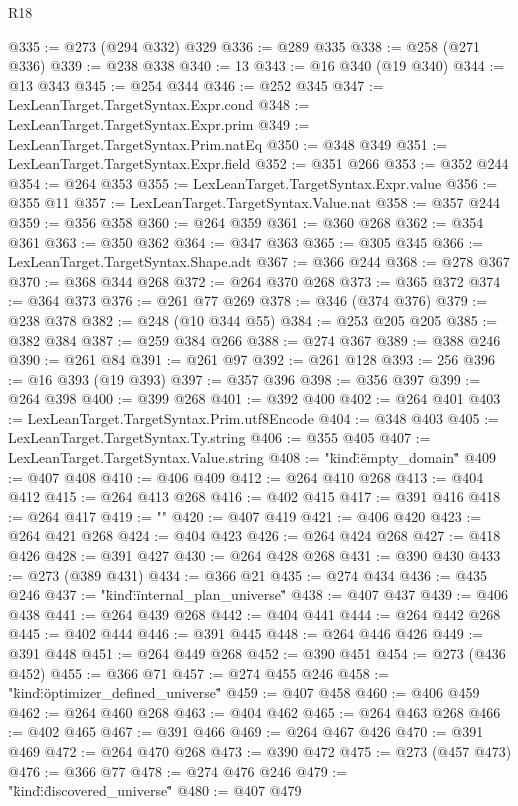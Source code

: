 \begin{lexlean}{R18}
\begin{coremodule}
@335 := @273 (@294 @332) @329
@336 := @289 @335
@338 := @258 (@271 @336)
@339 := @238 @338
@340 := 13
@343 := @16 @340 (@19 @340)
@344 := @13 @343
@345 := @254 @344
@346 := @252 @345
@347 := LexLeanTarget.TargetSyntax.Expr.cond
@348 := LexLeanTarget.TargetSyntax.Expr.prim
@349 := LexLeanTarget.TargetSyntax.Prim.natEq
@350 := @348 @349
@351 := LexLeanTarget.TargetSyntax.Expr.field
@352 := @351 @266
@353 := @352 @244
@354 := @264 @353
@355 := LexLeanTarget.TargetSyntax.Expr.value
@356 := @355 @11
@357 := LexLeanTarget.TargetSyntax.Value.nat
@358 := @357 @244
@359 := @356 @358
@360 := @264 @359
@361 := @360 @268
@362 := @354 @361
@363 := @350 @362
@364 := @347 @363
@365 := @305 @345
@366 := LexLeanTarget.TargetSyntax.Shape.adt
@367 := @366 @244
@368 := @278 @367
@370 := @368 @344 @268
@372 := @264 @370 @268
@373 := @365 @372
@374 := @364 @373
@376 := @261 @77 @269
@378 := @346 (@374 @376)
@379 := @238 @378
@382 := @248 (@10 @344 @55)
@384 := @253 @205 @205
@385 := @382 @384
@387 := @259 @384 @266
@388 := @274 @367
@389 := @388 @246
@390 := @261 @84
@391 := @261 @97
@392 := @261 @128
@393 := 256
@396 := @16 @393 (@19 @393)
@397 := @357 @396
@398 := @356 @397
@399 := @264 @398
@400 := @399 @268
@401 := @392 @400
@402 := @264 @401
@403 := LexLeanTarget.TargetSyntax.Prim.utf8Encode
@404 := @348 @403
@405 := LexLeanTarget.TargetSyntax.Ty.string
@406 := @355 @405
@407 := LexLeanTarget.TargetSyntax.Value.string
@408 := "{\"kind\":\"empty_domain\""
@409 := @407 @408
@410 := @406 @409
@412 := @264 @410 @268
@413 := @404 @412
@415 := @264 @413 @268
@416 := @402 @415
@417 := @391 @416
@418 := @264 @417
@419 := "}"
@420 := @407 @419
@421 := @406 @420
@423 := @264 @421 @268
@424 := @404 @423
@426 := @264 @424 @268
@427 := @418 @426
@428 := @391 @427
@430 := @264 @428 @268
@431 := @390 @430
@433 := @273 (@389 @431)
@434 := @366 @21
@435 := @274 @434
@436 := @435 @246
@437 := "{\"kind\":\"internal_plan_universe\""
@438 := @407 @437
@439 := @406 @438
@441 := @264 @439 @268
@442 := @404 @441
@444 := @264 @442 @268
@445 := @402 @444
@446 := @391 @445
@448 := @264 @446 @426
@449 := @391 @448
@451 := @264 @449 @268
@452 := @390 @451
@454 := @273 (@436 @452)
@455 := @366 @71
@457 := @274 @455 @246
@458 := "{\"kind\":\"optimizer_defined_universe\""
@459 := @407 @458
@460 := @406 @459
@462 := @264 @460 @268
@463 := @404 @462
@465 := @264 @463 @268
@466 := @402 @465
@467 := @391 @466
@469 := @264 @467 @426
@470 := @391 @469
@472 := @264 @470 @268
@473 := @390 @472
@475 := @273 (@457 @473)
@476 := @366 @77
@478 := @274 @476 @246
@479 := "{\"kind\":\"discovered_universe\""
@480 := @407 @479
}}}
\end{coremodule}
\end{lexlean}
